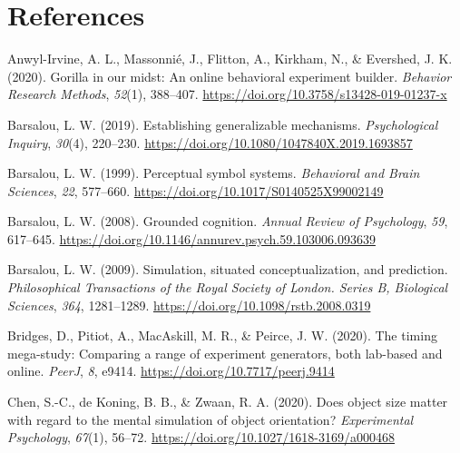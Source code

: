 \documentclass[
  man]{apa7}
\newlength{\cslhangindent}
\newlength{\cslentryspacingunit} %
\newenvironment{CSLReferences}[2] %
 {%
  \setlength{\parindent}{0pt}
  \ifodd #1
  \let\oldpar\par
  \def\par{\hangindent=\cslhangindent\oldpar}
  \fi
  \setlength{\parskip}{#2\cslentryspacingunit}
 }%
 {}
\begin{document}
\newpage

\hypertarget{references}{%
\section{References}\label{references}}

\begingroup
\setlength{\parindent}{-0.5in}
\setlength{\leftskip}{0.5in}

\hypertarget{refs}{}
\begin{CSLReferences}{1}{0}
\leavevmode{}%
Anwyl-Irvine, A. L., Massonnié, J., Flitton, A., Kirkham, N., \& Evershed, J. K. (2020). Gorilla in our midst: {An} online behavioral experiment builder. \emph{Behavior Research Methods}, \emph{52}(1), 388--407. \url{https://doi.org/10.3758/s13428-019-01237-x}

\leavevmode{}%
Barsalou, L. W. (2019). Establishing generalizable mechanisms. \emph{Psychological Inquiry}, \emph{30}(4), 220--230. \url{https://doi.org/10.1080/1047840X.2019.1693857}

\leavevmode{}%
Barsalou, L. W. (1999). Perceptual symbol systems. \emph{Behavioral and Brain Sciences}, \emph{22}, 577--660. \url{https://doi.org/10.1017/S0140525X99002149}

\leavevmode{}%
Barsalou, L. W. (2008). Grounded cognition. \emph{Annual Review of Psychology}, \emph{59}, 617--645. \url{https://doi.org/10.1146/annurev.psych.59.103006.093639}

\leavevmode{}%
Barsalou, L. W. (2009). Simulation, situated conceptualization, and prediction. \emph{Philosophical Transactions of the Royal Society of London. Series B, Biological Sciences}, \emph{364}, 1281--1289. \url{https://doi.org/10.1098/rstb.2008.0319}

\leavevmode{}%
Bridges, D., Pitiot, A., MacAskill, M. R., \& Peirce, J. W. (2020). The timing mega-study: Comparing a range of experiment generators, both lab-based and online. \emph{PeerJ}, \emph{8}, e9414. \url{https://doi.org/10.7717/peerj.9414}

\leavevmode{}%
Chen, S.-C., de Koning, B. B., \& Zwaan, R. A. (2020). Does object size matter with regard to the mental simulation of object orientation? \emph{Experimental Psychology}, \emph{67}(1), 56--72. \url{https://doi.org/10.1027/1618-3169/a000468}


\end{CSLReferences}
\end{document}
